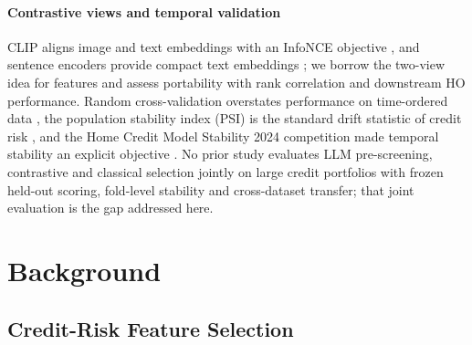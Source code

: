 \documentclass[final,5p,twocolumn]{elsarticle}
\begin{document}
\paragraph{Contrastive views and temporal validation}
CLIP aligns image and text embeddings with an InfoNCE objective \cite{radford2021,oord2018}, and sentence encoders provide compact text embeddings \cite{reimers2019,wang2020minilm}; we borrow the two-view idea for features and assess portability with rank correlation \cite{spearman1904} and downstream HO performance. Random cross-validation overstates performance on time-ordered data \cite{bergmeir2012,gama2014}, the population stability index (PSI) is the standard drift statistic of credit risk \cite{yurdakul2020}, and the Home Credit Model Stability 2024 competition made temporal stability an explicit objective \cite{homecredit2024}. No prior study evaluates LLM pre-screening, contrastive and classical selection jointly on large credit portfolios with frozen held-out scoring, fold-level stability and cross-dataset transfer; that joint evaluation is the gap addressed here.


\section{Background}
\label{sec:background}

\subsection{Credit-Risk Feature Selection}
\label{subsec:credit_risk_fs}
\end{document}
